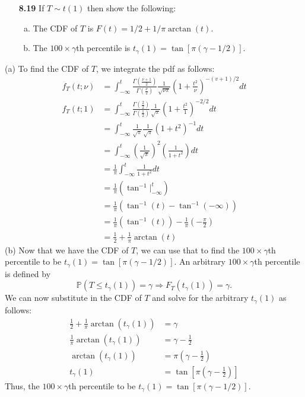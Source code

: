 \documentclass[11pt]{article}
\theoremstyle{definition}
\renewcommand{\P}{\mathbb{P}}
\newcommand{\1}[1]{\mathbf{1} \left \{ #1 \right \}}
\begin{document}
\begin{itemize}
\item [{\color{red} \textbf{8.19}}] If $T \sim t(1)$ then show the following:
\begin{enumerate}[(a)]
\item The CDF of $T$ is $F(t) = 1/2 + 1/\pi\arctan (t)$.
\item The $100 \times \gamma$th percentile is $t_{\gamma}(1) = \tan[\pi (\gamma - 1/2)]$.
\end{enumerate}
\end{itemize}
(a) To find the CDF of $T$, we integrate the pdf as follows:
\begin{equation*}
    \begin{split}
        f_T (t;\nu) &= \int_{-\infty}^t \frac{\Gamma\left(\frac{\nu+1}{2}\right)}{\Gamma\left(\frac{\nu}{2}\right)} \frac{1}{\sqrt{\nu\pi}} \left(1+\frac{t^2}{\nu}\right)^{-(v+1)/2} dt \\
        f_T (t;1) &= \int_{-\infty}^t \frac{\Gamma\left(\frac{2}{2}\right)}{\Gamma\left(\frac{1}{2}\right)} \frac{1}{\sqrt{\pi}} \left(1+\frac{t^2}{1}\right)^{-2/2} dt \\
        &= \int_{-\infty}^t \frac{1}{\sqrt{\pi}} \frac{1}{\sqrt{\pi}} \left(1+t^2\right)^{-1} dt \\
        &= \int_{-\infty}^t \left(\frac{1}{\sqrt{\pi}}\right)^2 \left(\frac{1}{1+t^2}\right) dt \\
        &= \frac{1}{\pi} \int_{-\infty}^t \frac{1}{1+t^2} dt \\
        &= \frac{1}{\pi}\left(\tan^{-1}\Big|_{-\infty}^t\right) \\
        &= \frac{1}{\pi}\left(\tan^{-1}(t) - \tan^{-1}(-\infty)\right) \\
        &= \frac{1}{\pi}\left(\tan^{-1}(t)\right) - \frac{1}{\pi}\left(-\frac{\pi}{2}\right) \\
        &= \frac{1}{2} + \frac{1}{\pi}\arctan (t)
    \end{split}
\end{equation*}
(b) Now that we have the CDF of $T$, we can use that to find the $100 \times \gamma$th percentile to be $t_{\gamma}(1) = \tan[\pi (\gamma - 1/2)]$.  An arbitrary $100 \times \gamma$th percentile is defined by
\[\P\left(T \leq t_{\gamma}(1)\right) = \gamma \Longrightarrow F_T \left(t_{\gamma}(1)\right) = \gamma.\]
We can now substitute in the CDF of $T$ and solve for the arbitrary $t_{\gamma}(1)$ as follows:
\begin{equation*}
    \begin{split}
        \frac{1}{2} + \frac{1}{\pi} \arctan \left(t_{\gamma} (1)\right) &= \gamma \\
        \frac{1}{\pi} \arctan \left(t_{\gamma} (1)\right) &= \gamma - \frac{1}{2} \\
        \arctan \left(t_{\gamma} (1)\right) &= \pi\left(\gamma - \frac{1}{2}\right) \\
        t_{\gamma} (1) &= \tan\left[\pi\left(\gamma - \frac{1}{2}\right)\right]
    \end{split}
\end{equation*}
Thus, the $100 \times \gamma$th percentile to be $t_{\gamma}(1) = \tan[\pi (\gamma - 1/2)]$.
\end{document}
